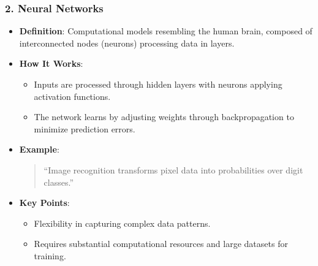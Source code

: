 \documentclass[aspectratio=169]{beamer}
\begin{document}
\begin{frame}[fragile]
    \frametitle{2. Neural Networks}
    \begin{itemize}
        \item \textbf{Definition}: Computational models resembling the human brain, composed of interconnected nodes (neurons) processing data in layers.
        \item \textbf{How It Works}:
        \begin{itemize}
            \item Inputs are processed through hidden layers with neurons applying activation functions.
            \item The network learns by adjusting weights through backpropagation to minimize prediction errors.
        \end{itemize}
        \item \textbf{Example}:
            \begin{quote}
                ``Image recognition transforms pixel data into probabilities over digit classes.''
            \end{quote}
        \item \textbf{Key Points}:
        \begin{itemize}
            \item Flexibility in capturing complex data patterns.
            \item Requires substantial computational resources and large datasets for training.
        \end{itemize}
    \end{itemize}
\end{frame}
\end{document}
